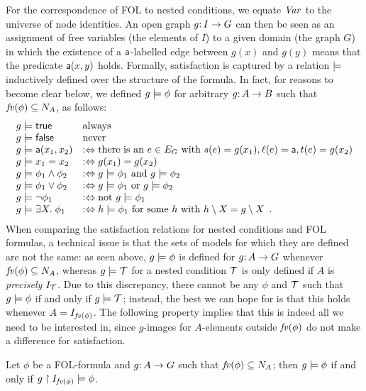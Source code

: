 For the correspondence of FOL to nested conditions, we equate $\mathit{Var}$ to the universe of node identities. An open graph $g{:}\, I\rightarrow G$ can then be seen as an assignment of free variables (the elements of $I$) to a given domain (the graph $G$) in which the existence of a $\mathsf{a}$-labelled edge between $g(x)$ and $g(y)$ means that the predicate $\mathsf{a}(x,y)$ holds. Formally, satisfaction is captured by a relation $\models$ inductively defined over the structure of the formula. In fact, for reasons to become clear below, we defined $g\models \phi$ for arbitrary $g{:}\, A\rightarrow B$ such that $\mathit{fv}(\phi)\subseteq N_A$, as follows:
%
\[\begin{array}{ll}
g\models \mathsf{true} & \text{always} \\
g\models \mathsf{false} & \text{never} \\
g\models \mathsf{a}(x_1,x_2) & :\Leftrightarrow \text{there is an } e\in E_G \text{ with } s(e)=g(x_1), \ell(e)=\mathsf{a}, t(e)=g(x_2) \\
g\models x_1=x_2 & :\Leftrightarrow g(x_1)=g(x_2) \\
g\models \phi_1\wedge \phi_2 & :\Leftrightarrow g\models \phi_1 \text{ and } g\models \phi_2 \\
g\models \phi_1\vee \phi_2 & :\Leftrightarrow g\models \phi_1 \text{ or } g\models \phi_2 \\
g\models \neg\phi_1 & :\Leftrightarrow \text{not } g\models \phi_1 \\
g\models \exists X.\; \phi_1  & :\Leftrightarrow h\models \phi_1 \text{ for some } h \text{ with } h\setminus X =g\setminus X \enspace.
\end{array}\]
%
When comparing the satisfaction relations for nested conditions and FOL formulas, a technical issue is that the sets of models for which they are defined are not the same: as seen above, $g\models\phi$ is defined for $g{:}\, A\rightarrow G$ whenever $\mathit{fv}(\phi)\subseteq N_A$, whereas $g\models{\mathcal{T}}$ for a nested condition ${\mathcal{T}}$ is only defined if $A$ is \emph{precisely} $I_{\mathcal{T}}$. Due to this discrepancy, there cannot be any $\phi$ and ${\mathcal{T}}$ such that $g\models \phi$ if and only if $g\models {\mathcal{T}}$; instead, the best we can hope for is that this holds whenever $A=I_{\mathit{fv}(\phi)}$. The following property implies that this is indeed all we need to be interested in, since $g$-images for $A$-elements outside $\mathit{fv}(\phi)$ do not make a difference for satisfaction.

\begin{proposition}\label{prop:free vars only}
Let $\phi$ be a FOL-formula and $g{:}\, A\rightarrow G$ such that $\mathit{fv}(\phi)\subseteq N_A$; then $g\models \phi$ if and only if $g\restriction I_{\mathit{fv}(\phi)}\models \phi$.
\end{proposition}


